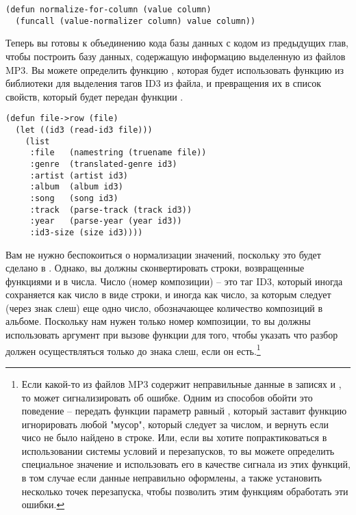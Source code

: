 \begin{lstlisting}
(defun normalize-for-column (value column)
  (funcall (value-normalizer column) value column))
\end{lstlisting}

Теперь вы готовы к объединению кода базы данных с кодом из предыдущих глав, чтобы
построить базу данных, содержащую информацию выделенную из файлов MP3.  Вы можете
определить функцию , которая будет использовать функцию  из
библиотеки  для выделения тагов ID3 из файла, и превращения их в список
свойств, который будет передан функции .

\begin{lstlisting}
(defun file->row (file)
  (let ((id3 (read-id3 file)))
    (list
     :file   (namestring (truename file))
     :genre  (translated-genre id3)
     :artist (artist id3)
     :album  (album id3)
     :song   (song id3)
     :track  (parse-track (track id3))
     :year   (parse-year (year id3))
     :id3-size (size id3))))
\end{lstlisting}

Вам не нужно беспокоиться о нормализации значений, поскольку это будет сделано в
.  Однако, вы должны сконвертировать строки, возвращенные функциями
 и  в числа.  Число  (номер композиции) -- это таг ID3,
который иногда сохраняется как число в виде строки, и иногда как число, за которым следует
(через знак слеш) еще одно число, обозначающее количество композиций в альбоме.  Поскольку
нам нужен только номер композиции, то вы должны использовать аргумент  при
вызове функции  для того, чтобы указать что разбор должен
осуществляться только до знака слеш, если он есть.\footnote{Если какой-то из файлов MP3
  содержит неправильные данные в записях  и , то
   может сигнализировать об ошибке. Одним из способов обойти это
  поведение -- передать функции  параметр  равный
  , который заставит функцию игнорировать любой "мусор", который следует за
  числом, и вернуть  если чисо не было найдено в строке.  Или, если вы хотите
  попрактиковаться в использовании системы условий и перезапусков, то вы можете определить
  специальное значение  и использовать его в качестве сигнала из этих функций,
  в том случае если данные неправильно оформлены, а также установить несколько точек
  перезапуска, чтобы позволить этим функциям обработать эти ошибки.}


